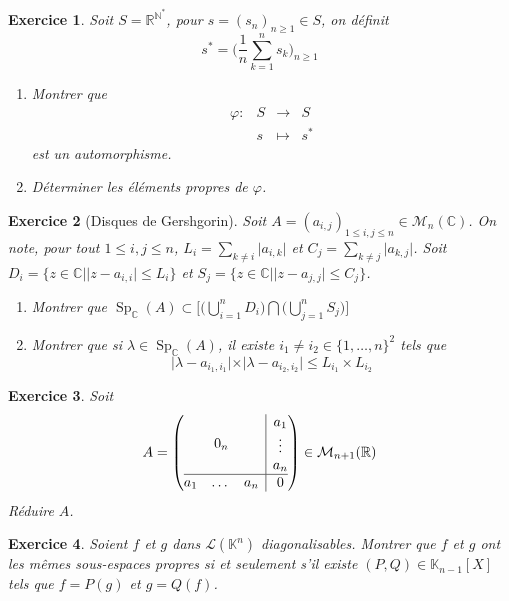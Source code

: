 \documentclass[12pt]{article}
\newtheorem{exercise}{Exercice}[section]
\theoremstyle{remark}
\theoremstyle{remark}
\newcommand{\K}{\mathbb{K}} \newcommand{\R}{\mathbb{R}}
\newcommand{\C}{\mathbb{C}} \newcommand{\Q}{\mathbb{Q}}
\newcommand{\N}{\mathbb{N}} \newcommand{\Z}{\mathbb{Z}}
\newcommand{\M}{\mathcal{M}} \renewcommand{\L}{\mathcal{L}}
\DeclareMathOperator{\Sp}{Sp} \DeclareMathOperator{\mat}{mat}
\newcommand{\function}[5]{
	$$
	\begin{array}{rccl}
		#1: & #2 & \to & #3 \\
		& #4 & \mapsto & #5
	\end{array}
	$$
}
\begin{document}
\begin{exercise}
	Soit $S=\R^{\N^{*}}$, pour $s=(s_{n})_{n\geqslant1}\in S$, on définit 
	$$s^{*}=\Biggl(\frac{1}{n}\sum_{k=1}^{n}s_{k}\Biggr)_{n\geqslant1}$$
	\begin{enumerate}
		\item Montrer que \function{\varphi}{S}{S}{s}{s^{*}} est un automorphisme.
		\item Déterminer les éléments propres de $\varphi$.
	\end{enumerate}
\end{exercise}

\begin{exercise}[Disques de Gershgorin]
	Soit $A=(a_{i,j})_{1\leqslant i,j\leqslant n}\in\M_{n}(\C)$. On note, pour tout $1\leqslant i,j\leqslant n$, $L_{i}=\sum_{k\neq i}\vert a_{i,k}\vert$ et $C_{j}=\sum_{k\neq j}\vert a_{k,j}\vert$. Soit $D_{i}=\{z\in\C\mid\vert z-a_{i,i}\vert\leqslant L_{i}\}$ et $S_{j}=\{z\in\C\mid\vert z-a_{j,j}\vert\leqslant C_{j}\}$.
	\begin{enumerate}
		\item Montrer que $\Sp_{\C}(A)\subset\Biggl[\biggl(\bigcup_{i=1}^{n}D_{i}\biggr)\bigcap \biggl(\bigcup_{j=1}^{n}S_{j}\biggr)\Biggr]$
		\item Montrer que si $\lambda\in\Sp_{\C}(A)$, il existe $i_{1}\neq i_{2}\in\{1,\dots,n\}^{2}$ tels que 
		$$\vert\lambda-a_{i_{1},i_{1}}\vert\times\vert\lambda-a_{i_{2},i_{2}}\vert\leqslant L_{i_{1}}\times L_{i_{2}}$$
	\end{enumerate}
\end{exercise}

\begin{exercise}
	Soit 
	$$
	A=
	\left(
		\begin{array}{@{}c|c@{}}
		0_{n} &
		\begin{matrix}
			a_{1}\\
			\vdots\\
			a_{n}
			\end{matrix}
			\\
		\hline
		\begin{matrix}
			a_{1} &
			\dots
			& a_{n}
			\end{matrix}
			& 0
		\end{array}
		\right)\in \M_{n+1}(\R)
	$$
	Réduire $A$.
\end{exercise}

\begin{exercise}
	Soient $f$ et $g$ dans $\L(\K^{n})$ diagonalisables. Montrer que $f$ et $g$ ont les mêmes sous-espaces propres si et seulement s'il existe $(P,Q)\in\K_{n-1}[X]$ tels que $f=P(g)$ et $g=Q(f)$.
\end{exercise}
\end{document}
